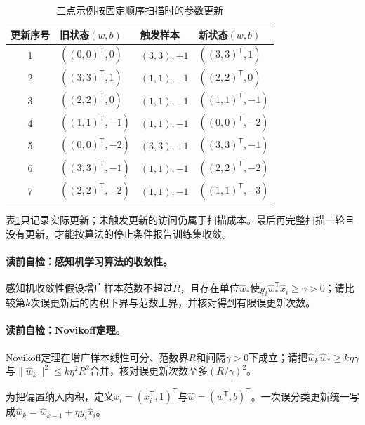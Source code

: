 \begin{table}[htbp]
\centering
\caption{三点示例按固定顺序扫描时的参数更新}\label{tab:V2-C01-primal-trace}
\begin{tabularx}{\linewidth}{@{}c X X X@{}}
\toprule 更新序号 & 旧状态$(w,b)$ & 触发样本 & 新状态$(w,b)$\\ \midrule
1 & $((0,0)^{\mathsf T},0)$ & $(3,3),+1$ & $((3,3)^{\mathsf T},1)$\\
2 & $((3,3)^{\mathsf T},1)$ & $(1,1),-1$ & $((2,2)^{\mathsf T},0)$\\
3 & $((2,2)^{\mathsf T},0)$ & $(1,1),-1$ & $((1,1)^{\mathsf T},-1)$\\
4 & $((1,1)^{\mathsf T},-1)$ & $(1,1),-1$ & $((0,0)^{\mathsf T},-2)$\\
5 & $((0,0)^{\mathsf T},-2)$ & $(3,3),+1$ & $((3,3)^{\mathsf T},-1)$\\
6 & $((3,3)^{\mathsf T},-1)$ & $(1,1),-1$ & $((2,2)^{\mathsf T},-2)$\\
7 & $((2,2)^{\mathsf T},-2)$ & $(1,1),-1$ & $((1,1)^{\mathsf T},-3)$\\
\bottomrule
\end{tabularx}
\end{table}
表\ref{tab:V2-C01-primal-trace}只记录实际更新；未触发更新的访问仍属于扫描成本。最后再完整扫描一轮且没有更新，才能按算法的停止条件报告训练集收敛。


\paragraph{读前自检：感知机学习算法的收敛性。}感知机收敛性假设增广样本范数不超过$R$，且存在单位$\widehat w_*$使$y_i\widehat w_*^{\mathsf T}\widehat x_i\ge\gamma>0$；请比较第$k$次误更新后的内积下界与范数上界，并核对得到有限误更新次数。\par
\paragraph{读前自检：Novikoff定理。}Novikoff定理在增广样本线性可分、范数界$R$和间隔$\gamma>0$下成立；请把$\widehat w_k^{\mathsf T}\widehat w_*\ge k\eta\gamma$与$\lVert\widehat w_k\rVert^2\le k\eta^2R^2$合并，核对误更新次数至多$(R/\gamma)^2$。\par

为把偏置纳入内积，定义$\widehat x_i=(x_i^{\mathsf T},1)^{\mathsf T}$与$\widehat w=(w^{\mathsf T},b)^{\mathsf T}$。一次误分类更新统一写成$\widehat w_k=\widehat w_{k-1}+\eta y_i\widehat x_i$。

